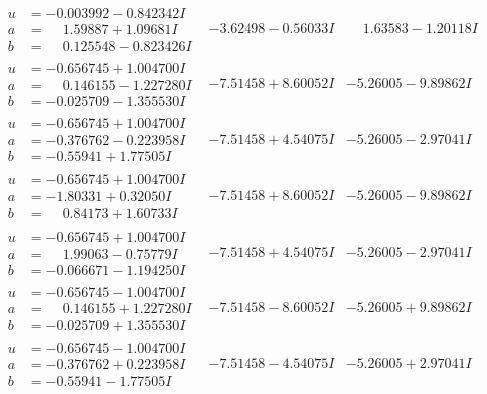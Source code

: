 \documentclass[1p]{elsarticle_modified}
\theoremstyle{definition}
\begin{document}
$$\begin{array}{c|c|c}
\begin{aligned}
u &= -0.003992 - 0.842342 I \\
a &= \phantom{-}1.59887 + 1.09681 I \\
b &= \phantom{-}0.125548 - 0.823426 I\end{aligned}
 & -3.62498 - 0.56033 I & \phantom{-}1.63583 - 1.20118 I \\ \hline\begin{aligned}
u &= -0.656745 + 1.004700 I \\
a &= \phantom{-}0.146155 - 1.227280 I \\
b &= -0.025709 - 1.355530 I\end{aligned}
 & -7.51458 + 8.60052 I & -5.26005 - 9.89862 I \\ \hline\begin{aligned}
u &= -0.656745 + 1.004700 I \\
a &= -0.376762 - 0.223958 I \\
b &= -0.55941 + 1.77505 I\end{aligned}
 & -7.51458 + 4.54075 I & -5.26005 - 2.97041 I \\ \hline\begin{aligned}
u &= -0.656745 + 1.004700 I \\
a &= -1.80331 + 0.32050 I \\
b &= \phantom{-}0.84173 + 1.60733 I\end{aligned}
 & -7.51458 + 8.60052 I & -5.26005 - 9.89862 I \\ \hline\begin{aligned}
u &= -0.656745 + 1.004700 I \\
a &= \phantom{-}1.99063 - 0.75779 I \\
b &= -0.066671 - 1.194250 I\end{aligned}
 & -7.51458 + 4.54075 I & -5.26005 - 2.97041 I \\ \hline\begin{aligned}
u &= -0.656745 - 1.004700 I \\
a &= \phantom{-}0.146155 + 1.227280 I \\
b &= -0.025709 + 1.355530 I\end{aligned}
 & -7.51458 - 8.60052 I & -5.26005 + 9.89862 I \\ \hline\begin{aligned}
u &= -0.656745 - 1.004700 I \\
a &= -0.376762 + 0.223958 I \\
b &= -0.55941 - 1.77505 I\end{aligned}
 & -7.51458 - 4.54075 I & -5.26005 + 2.97041 I \\ \hline\begin{aligned}

\end{aligned}
\end{array}$$
\end{document}
